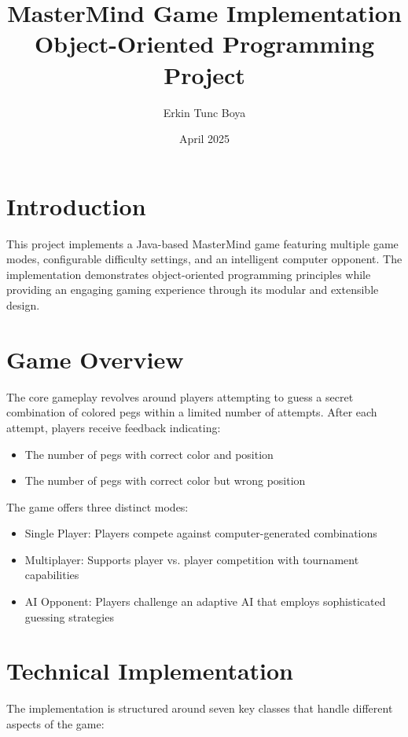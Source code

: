 \documentclass[english,a4paper]{article}
\title{\Large MasterMind Game Implementation\\
\large Object-Oriented Programming Project}
\author{Erkin Tunc Boya}
\date{April 2025}
\begin{document}
\maketitle

\section{Introduction}
This project implements a Java-based MasterMind game featuring multiple game modes, configurable difficulty settings, and an intelligent computer opponent. The implementation demonstrates object-oriented programming principles while providing an engaging gaming experience through its modular and extensible design.

\section{Game Overview}
The core gameplay revolves around players attempting to guess a secret combination of colored pegs within a limited number of attempts. After each attempt, players receive feedback indicating:
\begin{itemize}
\item The number of pegs with correct color and position
\item The number of pegs with correct color but wrong position
\end{itemize}

The game offers three distinct modes:
\begin{itemize}
\item Single Player: Players compete against computer-generated combinations
\item Multiplayer: Supports player vs. player competition with tournament capabilities
\item AI Opponent: Players challenge an adaptive AI that employs sophisticated guessing strategies
\end{itemize}

\section{Technical Implementation}
The implementation is structured around seven key classes that handle different aspects of the game:

\end{document}
